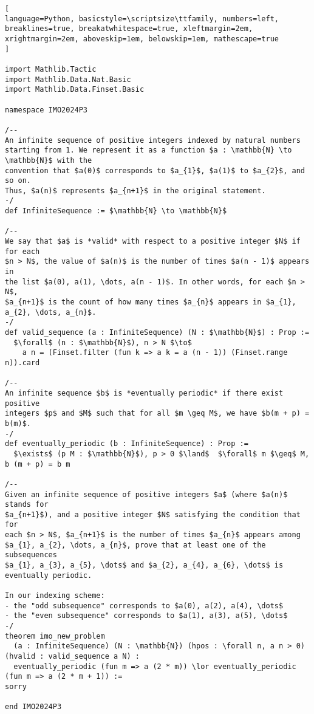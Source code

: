 \begin{tcolorbox}[enhanced, breakable, rounded corners,
    colback=green!5!white, colframe=green!75!black,
    colbacktitle=green!85!black, fonttitle=\bfseries, coltitle=white, title=Lean Theorem for 2024 IMO Problem 3]
\setlength{\parskip}{1em}
\begin{lstlisting}[
language=Python, basicstyle=\scriptsize\ttfamily, numbers=left, breaklines=true, breakatwhitespace=true, xleftmargin=2em, xrightmargin=2em, aboveskip=1em, belowskip=1em, mathescape=true
]

import Mathlib.Tactic
import Mathlib.Data.Nat.Basic
import Mathlib.Data.Finset.Basic

namespace IMO2024P3

/--
An infinite sequence of positive integers indexed by natural numbers
starting from 1. We represent it as a function $a : \mathbb{N} \to \mathbb{N}$ with the
convention that $a(0)$ corresponds to $a_{1}$, $a(1)$ to $a_{2}$, and so on.
Thus, $a(n)$ represents $a_{n+1}$ in the original statement.
-/
def InfiniteSequence := $\mathbb{N} \to \mathbb{N}$

/--
We say that $a$ is *valid* with respect to a positive integer $N$ if for each
$n > N$, the value of $a(n)$ is the number of times $a(n - 1)$ appears in
the list $a(0), a(1), \dots, a(n - 1)$. In other words, for each $n > N$,
$a_{n+1}$ is the count of how many times $a_{n}$ appears in $a_{1}, a_{2}, \dots, a_{n}$.
-/
def valid_sequence (a : InfiniteSequence) (N : $\mathbb{N}$) : Prop :=
  $\forall$ (n : $\mathbb{N}$), n > N $\to$
    a n = (Finset.filter (fun k => a k = a (n - 1)) (Finset.range n)).card

/--
An infinite sequence $b$ is *eventually periodic* if there exist positive
integers $p$ and $M$ such that for all $m \geq M$, we have $b(m + p) = b(m)$.
-/
def eventually_periodic (b : InfiniteSequence) : Prop :=
  $\exists$ (p M : $\mathbb{N}$), p > 0 $\land$  $\forall$ m $\geq$ M, b (m + p) = b m

/--
Given an infinite sequence of positive integers $a$ (where $a(n)$ stands for
$a_{n+1}$), and a positive integer $N$ satisfying the condition that for
each $n > N$, $a_{n+1}$ is the number of times $a_{n}$ appears among
$a_{1}, a_{2}, \dots, a_{n}$, prove that at least one of the subsequences
$a_{1}, a_{3}, a_{5}, \dots$ and $a_{2}, a_{4}, a_{6}, \dots$ is eventually periodic.

In our indexing scheme:
- the "odd subsequence" corresponds to $a(0), a(2), a(4), \dots$
- the "even subsequence" corresponds to $a(1), a(3), a(5), \dots$
-/
theorem imo_new_problem
  (a : InfiniteSequence) (N : \mathbb{N}) (hpos : \forall n, a n > 0) (hvalid : valid_sequence a N) :
  eventually_periodic (fun m => a (2 * m)) \lor eventually_periodic (fun m => a (2 * m + 1)) :=
sorry

end IMO2024P3
\end{lstlisting}
\end{tcolorbox}

